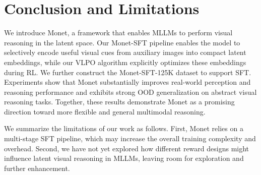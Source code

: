\section{Conclusion and Limitations}
\label{sec:conclusion}
We introduce Monet, a framework that enables MLLMs to perform visual reasoning in the latent space. Our Monet-SFT pipeline enables the model to selectively encode useful visual cues from auxiliary images into compact latent embeddings, while our VLPO algorithm explicitly optimizes these embeddings during RL. We further construct the Monet-SFT-125K dataset to support SFT. Experiments show that Monet substantially improves real-world perception and reasoning performance and exhibits strong OOD generalization on abstract visual reasoning tasks. Together, these results demonstrate Monet as a promising direction toward more flexible and general multimodal reasoning.

We summarize the limitations of our work as follows. First, Monet relies on a multi-stage SFT pipeline, which may increase the overall training complexity and overhead. Second, we have not yet explored how different reward designs might influence latent visual reasoning in MLLMs, leaving room for exploration and further enhancement.